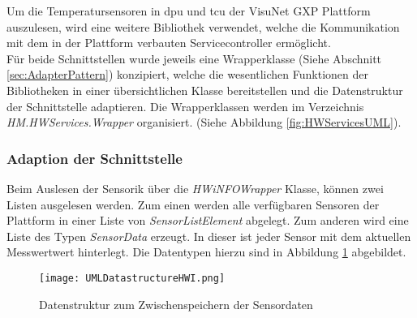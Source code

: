 Um die Temperatursensoren in \ac{dpu} und \ac{tcu} der VisuNet GXP Plattform auszulesen, wird eine weitere Bibliothek verwendet, welche die Kommunikation mit dem in der Plattform verbauten Servicecontroller ermöglicht.\\
Für beide Schnittstellen wurde jeweils eine Wrapperklasse (Siehe Abschnitt \ref{sec:AdapterPattern}) konzipiert, welche die wesentlichen Funktionen der Bibliotheken in einer übersichtlichen Klasse bereitstellen und die Datenstruktur der Schnittstelle adaptieren. Die Wrapperklassen werden im Verzeichnis \textit{HM.HWServices.Wrapper} organisiert. (Siehe Abbildung \ref{fig:HWServicesUML}).
\subsubsection*{Adaption der Schnittstelle}
Beim Auslesen der Sensorik über die \textit{HWiNFOWrapper} Klasse, können zwei Listen ausgelesen werden. Zum einen werden alle verfügbaren Sensoren der Plattform in einer Liste von \textit{SensorListElement} abgelegt. Zum anderen wird eine Liste des Typen \textit{SensorData} erzeugt. In dieser ist jeder Sensor mit dem aktuellen Messwertwert hinterlegt. Die Datentypen hierzu sind in Abbildung \ref{fig:DatastructuresUML} abgebildet.    
\begin{center}
    \begin{figure}[h!]
        \centering
        \texttt{[image: UMLDatastructureHWI.png]}
        \caption{Datenstruktur zum Zwischenspeichern der Sensordaten}
        \label{fig:DatastructuresUML}
    \end{figure}
\end{center}
\vspace{-1.8cm}

